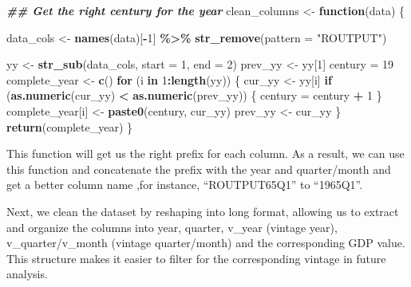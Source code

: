 \documentclass[
]{article}
\newenvironment{Shaded}{\begin{snugshade}}{\end{snugshade}}
\newcommand{\AttributeTok}[1]{\textcolor[rgb]{0.13,0.29,0.53}{#1}}
\newcommand{\ControlFlowTok}[1]{\textcolor[rgb]{0.13,0.29,0.53}{\textbf{#1}}}
\newcommand{\DecValTok}[1]{\textcolor[rgb]{0.00,0.00,0.81}{#1}}
\newcommand{\DocumentationTok}[1]{\textcolor[rgb]{0.56,0.35,0.01}{\textbf{\textit{#1}}}}
\newcommand{\FunctionTok}[1]{\textcolor[rgb]{0.13,0.29,0.53}{\textbf{#1}}}
\newcommand{\NormalTok}[1]{#1}
\newcommand{\OtherTok}[1]{\textcolor[rgb]{0.56,0.35,0.01}{#1}}
\newcommand{\SpecialCharTok}[1]{\textcolor[rgb]{0.81,0.36,0.00}{\textbf{#1}}}
\newcommand{\StringTok}[1]{\textcolor[rgb]{0.31,0.60,0.02}{#1}}
\begin{document}
\begin{Shaded}
\begin{Highlighting}[]
\DocumentationTok{\#\# Get the right century for the year}
\NormalTok{  clean\_columns }\OtherTok{\textless{}{-}} \ControlFlowTok{function}\NormalTok{(data) \{}
    
\NormalTok{    data\_cols }\OtherTok{\textless{}{-}} \FunctionTok{names}\NormalTok{(data)[}\SpecialCharTok{{-}}\DecValTok{1}\NormalTok{] }\SpecialCharTok{\%\textgreater{}\%}
      \FunctionTok{str\_remove}\NormalTok{(}\AttributeTok{pattern =} \StringTok{"ROUTPUT"}\NormalTok{)}
    
\NormalTok{    yy }\OtherTok{\textless{}{-}} \FunctionTok{str\_sub}\NormalTok{(data\_cols, }\AttributeTok{start =} \DecValTok{1}\NormalTok{, }\AttributeTok{end =} \DecValTok{2}\NormalTok{)}
\NormalTok{    prev\_yy }\OtherTok{\textless{}{-}}\NormalTok{ yy[}\DecValTok{1}\NormalTok{]}
\NormalTok{    century }\OtherTok{=} \DecValTok{19}
\NormalTok{    complete\_year }\OtherTok{\textless{}{-}} \FunctionTok{c}\NormalTok{()}
    \ControlFlowTok{for}\NormalTok{ (i }\ControlFlowTok{in} \DecValTok{1}\SpecialCharTok{:}\FunctionTok{length}\NormalTok{(yy)) \{}
\NormalTok{      cur\_yy }\OtherTok{\textless{}{-}}\NormalTok{ yy[i]}
      \ControlFlowTok{if}\NormalTok{ (}\FunctionTok{as.numeric}\NormalTok{(cur\_yy) }\SpecialCharTok{\textless{}} \FunctionTok{as.numeric}\NormalTok{(prev\_yy)) \{}
\NormalTok{        century }\OtherTok{=}\NormalTok{ century }\SpecialCharTok{+} \DecValTok{1}
\NormalTok{      \}}
\NormalTok{      complete\_year[i] }\OtherTok{\textless{}{-}} \FunctionTok{paste0}\NormalTok{(century, cur\_yy)}
\NormalTok{      prev\_yy }\OtherTok{\textless{}{-}}\NormalTok{ cur\_yy}
\NormalTok{    \}}
    \FunctionTok{return}\NormalTok{(complete\_year)}
\NormalTok{  \}}
\end{Highlighting}
\end{Shaded}

This function will get us the right prefix for each column. As a result,
we can use this function and concatenate the prefix with the year and
quarter/month and get a better column name ,for instance,
``ROUTPUT65Q1'' to ``1965Q1''.

Next, we clean the dataset by reshaping into long format, allowing us to
extract and organize the columns into year, quarter, v\_year (vintage
year), v\_quarter/v\_month (vintage quarter/month) and the corresponding
GDP value. This structure makes it easier to filter for the
corresponding vintage in future analysis.
\end{document}
